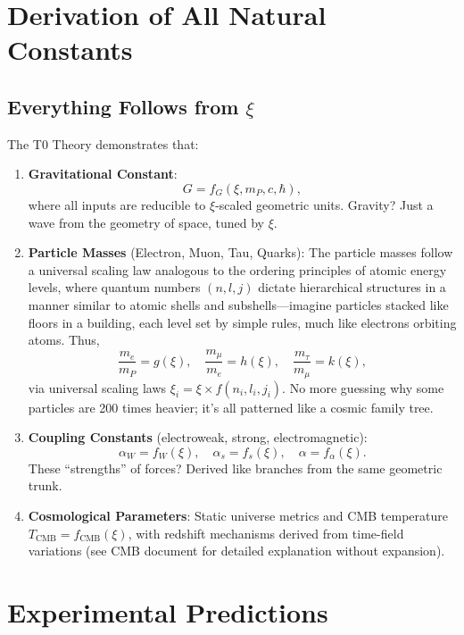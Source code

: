 	\section{Derivation of All Natural Constants}
	
	\subsection{Everything Follows from $\xi$}
	The T0 Theory demonstrates that:
	
	\begin{enumerate}
		\item \textbf{Gravitational Constant}:
		\[
		G = f_G(\xi, m_P, c, \hbar),
		\]
		where all inputs are reducible to $\xi$-scaled geometric units. Gravity? Just a wave from the geometry of space, tuned by $\xi$.
		
		\item \textbf{Particle Masses} (Electron, Muon, Tau, Quarks):
		The particle masses follow a universal scaling law analogous to the ordering principles of atomic energy levels, where quantum numbers $(n, l, j)$ dictate hierarchical structures in a manner similar to atomic shells and subshells—imagine particles stacked like floors in a building, each level set by simple rules, much like electrons orbiting atoms. Thus,
		\[
		\frac{m_e}{m_P} = g(\xi), \quad \frac{m_\mu}{m_e} = h(\xi), \quad \frac{m_\tau}{m_\mu} = k(\xi),
		\]
		via universal scaling laws $\xi_i = \xi \times f(n_i, l_i, j_i)$. No more guessing why some particles are 200 times heavier; it's all patterned like a cosmic family tree.
		
		\item \textbf{Coupling Constants} (electroweak, strong, electromagnetic):
		\[
		\alpha_W = f_W(\xi), \quad \alpha_s = f_s(\xi), \quad \alpha = f_\alpha(\xi).
		\]
		These ``strengths'' of forces? Derived like branches from the same geometric trunk.
		
		\item \textbf{Cosmological Parameters}:
		Static universe metrics and CMB temperature $T_{\text{CMB}} = f_{\text{CMB}}(\xi)$, with redshift mechanisms derived from time-field variations (see CMB document for detailed explanation without expansion).
	\end{enumerate}
	
	\section{Experimental Predictions}
	
